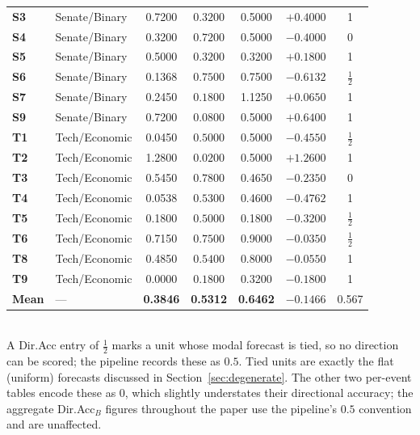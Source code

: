 \documentclass[11pt,journal,onecolumn]{IEEEtran}
\begin{document}
\begin{table}[!htbp]
\begin{tabular}{llccccc}
\textbf{S3} & Senate/Binary & 0.7200 & $\mathbf{0.3200}$ & 0.5000 & $\mathbf{+0.4000}$ & 1 \\
\textbf{S4} & Senate/Binary & 0.3200 & $0.7200$ & 0.5000 & $-0.4000$ & 0 \\
\textbf{S5} & Senate/Binary & 0.5000 & $\mathbf{0.3200}$ & 0.3200 & $\mathbf{+0.1800}$ & 1 \\
\textbf{S6} & Senate/Binary & 0.1368 & $0.7500$ & 0.7500 & $-0.6132$ & $\frac{1}{2}$ \\
\textbf{S7} & Senate/Binary & 0.2450 & $\mathbf{0.1800}$ & 1.1250 & $\mathbf{+0.0650}$ & 1 \\
\textbf{S9} & Senate/Binary & 0.7200 & $\mathbf{0.0800}$ & 0.5000 & $\mathbf{+0.6400}$ & 1 \\
\textbf{T1} & Tech/Economic & 0.0450 & $0.5000$ & 0.5000 & $-0.4550$ & $\frac{1}{2}$ \\
\textbf{T2} & Tech/Economic & 1.2800 & $\mathbf{0.0200}$ & 0.5000 & $\mathbf{+1.2600}$ & 1 \\
\textbf{T3} & Tech/Economic & 0.5450 & $0.7800$ & 0.4650 & $-0.2350$ & 0 \\
\textbf{T4} & Tech/Economic & 0.0538 & $0.5300$ & 0.4600 & $-0.4762$ & 1 \\
\textbf{T5} & Tech/Economic & 0.1800 & $0.5000$ & 0.1800 & $-0.3200$ & $\frac{1}{2}$ \\
\textbf{T6} & Tech/Economic & 0.7150 & $0.7500$ & 0.9000 & $-0.0350$ & $\frac{1}{2}$ \\
\textbf{T8} & Tech/Economic & 0.4850 & $0.5400$ & 0.8000 & $-0.0550$ & 1 \\
\textbf{T9} & Tech/Economic & 0.0000 & $0.1800$ & 0.3200 & $-0.1800$ & 1 \\
\midrule
\textbf{Mean} & --- & \textbf{0.3846} & \textbf{0.5312} & \textbf{0.6462} & $-0.1466$ & 0.567 \\
\bottomrule
\end{tabular}
\smallskip \\
\footnotesize A Dir.Acc entry of $\frac{1}{2}$ marks a unit whose modal forecast is tied, so no direction can be scored; the pipeline records these as $0.5$. Tied units are exactly the flat (uniform) forecasts discussed in Section~\ref{sec:degenerate}. The other two per-event tables encode these as $0$, which slightly understates their directional accuracy; the aggregate Dir.Acc$_B$ figures throughout the paper use the pipeline's $0.5$ convention and are unaffected.
\end{table}
\end{document}
